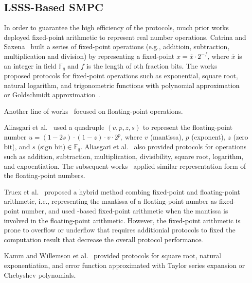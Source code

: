 \subsection{LSSS-Based SMPC}
\label{subsec:LSSS-BasedSMPC}
In order to guarantee the high efficiency of the \smpc protocols, much prior works~\cite{catrina2010secure,liedel2012secure,hemenway2016high,aly2019benchmarking,lu2020faster} deployed fixed-point arithmetic to represent real number operations.
Catrina and Saxena~\cite{catrina2010secure} built a series of fixed-point operations (e.g., additioin, subtraction, multiplication and division) by representing a fixed-point $x = \overline{x}\cdot  2^{-f}$, where $\overline{x}$ is an integer in field $\mathbb{F} _q$ and $f$ is the length of oth fraction bits.
The works~\cite{liedel2012secure,hemenway2016high,aly2019benchmarking,lu2020faster} proposed protocols for fixed-point operations such as exponential, square root, natural logarithm, and trigonometric functions with polynomial approximation~\cite{hart1978computer} or Goldschmidt approximation~\cite{markstein2004software}.

Another line of works~\cite{aliasgari2012secure,krips2014hybrid,kamm2015secure,rathee2022secfloat} focused on floating-point operations.

Aliasgari et al.~\cite{aliasgari2012secure} used a quadruple $\left(v, p, z, s\right) $ to represent the floating-point number $u= \left(1-2s\right) \cdot \left(1-z\right) \cdot v \cdot 2^p$, where $v$ (mantissa), $p$ (exponent), $z$ (zero bit), and $s \text{ (sign bit)}\in \mathbb{F} _q$. Aliasgari et al.~\cite{aliasgari2012secure} also provided \smpc protocols for operations such as addition, subtraction, multiplication, divisibility, square root, logarithm, and expoentiation.
The subsequent works~\cite{krips2014hybrid,kamm2015secure,rathee2022secfloat} applied similar representation form of the floating-point numbers.

Truex et al.~\cite{truex2019hybrid} proposed a hybrid method combing fixed-point and floating-point arithmetic, i.e., representing the mantissa of a floating-point number as fixed-point number, and used \lsss-based fixed-point arithmetic when the mantissa is involved in the floating-point arithmetic. However, the fixed-point arithmetic is prone to overflow or underflow that requires additionial \smpc protocols to fixed the computation result that decrease the overall protocol performance.

Kamm and Willemson et al.~\cite{kamm2015secure} provided \smpc protocols for square root, natural exponentiation, and error function approximated with Taylor series expansion or Chebyshev polynomials.

